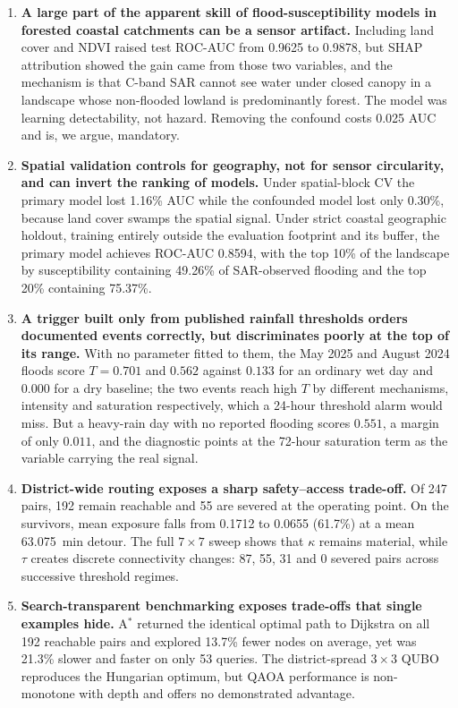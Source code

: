 \documentclass[10pt,twocolumn]{article}
\begin{document}
\begin{enumerate}
\itemsep3pt
\item \textbf{A large part of the apparent skill of flood-susceptibility models
      in forested coastal catchments can be a sensor artifact.} Including land
      cover and NDVI raised test ROC-AUC from 0.9625 to 0.9878, but SHAP
      attribution showed the gain came from those two variables, and the
      mechanism is that C-band SAR cannot see water under closed canopy in a
      landscape whose non-flooded lowland is predominantly forest. The model was
      learning detectability, not hazard. Removing the confound costs 0.025 AUC
      and is, we argue, mandatory.
\item \textbf{Spatial validation controls for geography, not for sensor
      circularity, and can invert the ranking of models.} Under spatial-block CV
      the primary model lost 1.16\% AUC while the confounded model lost only
      0.30\%, because land cover swamps the spatial signal. Under strict
      coastal geographic holdout, training entirely outside the evaluation
      footprint and its buffer, the primary model achieves ROC-AUC 0.8594, with
      the top 10\% of the landscape by susceptibility containing 49.26\% of
      SAR-observed flooding and the top 20\% containing 75.37\%.
\item \textbf{A trigger built only from published rainfall thresholds orders
      documented events correctly, but discriminates poorly at the top of its
      range.} With no parameter fitted to them, the May 2025 and August 2024
      floods score $T=0.701$ and $0.562$ against $0.133$ for an ordinary wet day
      and $0.000$ for a dry baseline; the two events reach high $T$ by different
      mechanisms, intensity and saturation respectively, which a 24-hour
      threshold alarm would miss. But a heavy-rain day with no reported flooding
      scores $0.551$, a margin of only $0.011$, and the diagnostic points at the
      72-hour saturation term as the variable carrying the real signal.
\item \textbf{District-wide routing exposes a sharp safety--access trade-off.}
      Of 247 pairs, 192 remain reachable and 55 are severed at the operating
      point. On the survivors, mean exposure falls from 0.1712 to 0.0655 (61.7\%)
      at a mean \SI{63.075}{\minute} detour. The full $7\times7$ sweep shows that
      $\kappa$ remains material, while $\tau$ creates discrete connectivity
      changes: 87, 55, 31 and 0 severed pairs across successive threshold regimes.
\item \textbf{Search-transparent benchmarking exposes trade-offs that single
      examples hide.} A$^\ast$ returned the identical optimal path to Dijkstra on
      all 192 reachable pairs and explored 13.7\% fewer nodes on average, yet was
      21.3\% slower and faster on only 53 queries. The district-spread $3\times3$
      QUBO reproduces the Hungarian optimum, but QAOA performance is non-monotone
      with depth and offers no demonstrated advantage.
\end{enumerate}
\end{document}

